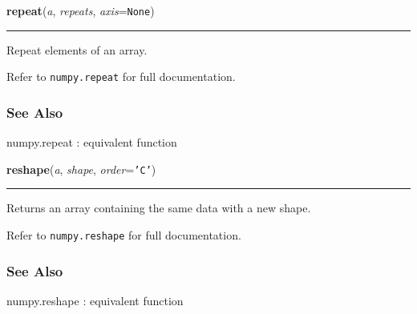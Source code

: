     \label{numpy:ndarray:repeat}

    \vspace{0.5ex}

    \begin{boxedminipage}{\textwidth}

    \raggedright \textbf{repeat}(\textit{a}, \textit{repeats}, \textit{axis}=\texttt{None})

    \vspace{-1.5ex}

    \rule{\textwidth}{0.5\fboxrule}

Repeat elements of an array.

Refer to \texttt{numpy.repeat} for full documentation.



\hypertarget{see-also}{}
\subsubsection*{See Also}

numpy.repeat : equivalent function
    \vspace{1ex}

    \end{boxedminipage}

    \label{numpy:ndarray:reshape}

    \vspace{0.5ex}

    \begin{boxedminipage}{\textwidth}

    \raggedright \textbf{reshape}(\textit{a}, \textit{shape}, \textit{order}=\texttt{'C'})

    \vspace{-1.5ex}

    \rule{\textwidth}{0.5\fboxrule}

Returns an array containing the same data with a new shape.

Refer to \texttt{numpy.reshape} for full documentation.



\hypertarget{see-also}{}
\subsubsection*{See Also}

numpy.reshape : equivalent function
    \vspace{1ex}

    \end{boxedminipage}


